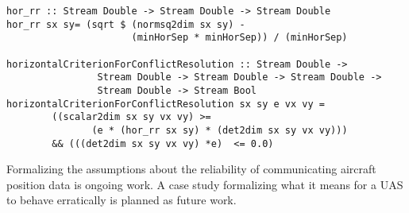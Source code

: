 %
%
%
%
\begin{lstlisting}[frame=single]
hor_rr :: Stream Double -> Stream Double -> Stream Double
hor_rr sx sy= (sqrt $ (normsq2dim sx sy) - 
                      (minHorSep * minHorSep)) / (minHorSep)  

horizontalCriterionForConflictResolution :: Stream Double ->
                Stream Double -> Stream Double -> Stream Double ->
                Stream Double -> Stream Bool
horizontalCriterionForConflictResolution sx sy e vx vy =
        ((scalar2dim sx sy vx vy) >=
               (e * (hor_rr sx sy) * (det2dim sx sy vx vy))) 
        && (((det2dim sx sy vx vy) *e)  <= 0.0) 
\end{lstlisting}

Formalizing the assumptions about the reliability of communicating
aircraft position data is ongoing work.  A case study formalizing what
it means for a UAS to behave erratically is planned as future
work.  


%
%
%



